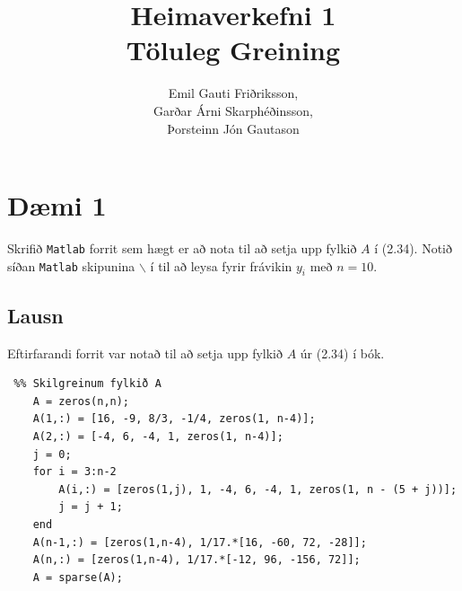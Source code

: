 \documentclass[11pt]{article}
\title{Heimaverkefni 1\\ \vspace{0.4cm} \large Töluleg Greining}
\author{Emil Gauti Friðriksson,\\ Garðar Árni Skarphéðinsson,\\ Þorsteinn Jón Gautason}
\begin{document}
\maketitle %
\thispagestyle{empty}
\newpage
\setcounter{page}{1}
\section*{Dæmi 1}
Skrifið \texttt{Matlab} forrit sem hægt er að nota til að setja upp fylkið $A$ í (2.34). Notið síðan \texttt{Matlab} skipunina $\backslash$ í  til að leysa fyrir frávikin $y_i$ með $n = 10$.
\subsection*{Lausn}
Eftirfarandi forrit var notað til að setja upp fylkið $A$ úr (2.34) í bók.
\begin{verbatim}
 %% Skilgreinum fylkið A
    A = zeros(n,n);
    A(1,:) = [16, -9, 8/3, -1/4, zeros(1, n-4)];
    A(2,:) = [-4, 6, -4, 1, zeros(1, n-4)];
    j = 0;
    for i = 3:n-2
        A(i,:) = [zeros(1,j), 1, -4, 6, -4, 1, zeros(1, n - (5 + j))]; 
        j = j + 1;
    end
    A(n-1,:) = [zeros(1,n-4), 1/17.*[16, -60, 72, -28]];
    A(n,:) = [zeros(1,n-4), 1/17.*[-12, 96, -156, 72]];
    A = sparse(A);
\end{verbatim}
\end{document}
